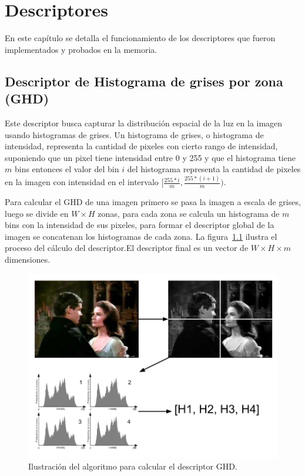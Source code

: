 \chapter{Descriptores}\label{cap_descriptores}
 En este capítulo se detalla el funcionamiento de los descriptores que fueron implementados y probados en la memoria.

\section{Descriptor de Histograma de grises por zona (GHD)}\label{ghd}
Este descriptor busca capturar la distribución espacial de la luz en la imagen usando histogramas de grises. Un histograma de grises, o histograma de intensidad, representa la cantidad de pixeles con cierto rango de intensidad, suponiendo que un pixel tiene intensidad entre 0 y 255 y que el histograma tiene $m$ bins entonces el valor del bin $i$ del histograma representa la cantidad de pixeles en la imagen con intensidad en el intervalo $[\frac{255*i}{m},\frac{255*(i+1)}{m})$.

Para calcular el GHD de una imagen primero se pasa la imagen a escala de grises, luego se divide en $W \times H$ zonas, para cada zona se calcula un histograma de $m$ bins con la intensidad de sus pixeles, para formar el descriptor global de la imagen se concatenan los histogramas de cada zona. La figura~\ref{descriptor_ghd} ilustra el proceso del cálculo del descriptor.El descriptor final es un vector de $W \times H \times m$ dimensiones.
    \begin{figure}[!h]
		\centering
		\includegraphics[scale=0.4]{imagenes/cap3/descriptor_ghd.png}
		\caption{Ilustración del algoritmo para calcular el descriptor GHD.}
		\label{descriptor_ghd}
	\end{figure}

